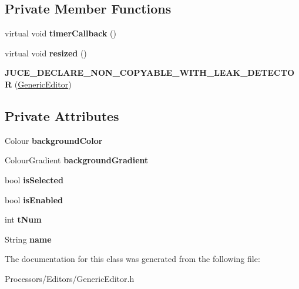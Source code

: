 \subsection*{Private Member Functions}
\begin{DoxyCompactItemize}
\item 
\hypertarget{classGenericEditor_a12c45104009fc083007c65f040583320}{virtual void {\bfseries timer\-Callback} ()}\label{classGenericEditor_a12c45104009fc083007c65f040583320}

\item 
\hypertarget{classGenericEditor_aab1e9c4f507c32cd1683a4fd2b610718}{virtual void {\bfseries resized} ()}\label{classGenericEditor_aab1e9c4f507c32cd1683a4fd2b610718}

\item 
\hypertarget{classGenericEditor_a4deed1f9dcc59fb630d0ca0a5d62b5ab}{{\bfseries J\-U\-C\-E\-\_\-\-D\-E\-C\-L\-A\-R\-E\-\_\-\-N\-O\-N\-\_\-\-C\-O\-P\-Y\-A\-B\-L\-E\-\_\-\-W\-I\-T\-H\-\_\-\-L\-E\-A\-K\-\_\-\-D\-E\-T\-E\-C\-T\-O\-R} (\hyperlink{classGenericEditor}{Generic\-Editor})}\label{classGenericEditor_a4deed1f9dcc59fb630d0ca0a5d62b5ab}

\end{DoxyCompactItemize}
\subsection*{Private Attributes}
\begin{DoxyCompactItemize}
\item 
\hypertarget{classGenericEditor_a0763036019394e15cc49ab1bffb57333}{Colour {\bfseries background\-Color}}\label{classGenericEditor_a0763036019394e15cc49ab1bffb57333}

\item 
\hypertarget{classGenericEditor_adfb224e3a4b76277d020172fa837c334}{Colour\-Gradient {\bfseries background\-Gradient}}\label{classGenericEditor_adfb224e3a4b76277d020172fa837c334}

\item 
\hypertarget{classGenericEditor_aee0ece43c57ee21df782e481fc8e8959}{bool {\bfseries is\-Selected}}\label{classGenericEditor_aee0ece43c57ee21df782e481fc8e8959}

\item 
\hypertarget{classGenericEditor_a2481dbae00beaed730efcaa00e6d8e92}{bool {\bfseries is\-Enabled}}\label{classGenericEditor_a2481dbae00beaed730efcaa00e6d8e92}

\item 
\hypertarget{classGenericEditor_aa6ac3f1214a6e746a04293b2a17f5912}{int {\bfseries t\-Num}}\label{classGenericEditor_aa6ac3f1214a6e746a04293b2a17f5912}

\item 
\hypertarget{classGenericEditor_a7e0e6439c13dbea6863e0f4c9468700c}{String {\bfseries name}}\label{classGenericEditor_a7e0e6439c13dbea6863e0f4c9468700c}

\end{DoxyCompactItemize}


The documentation for this class was generated from the following file\-:\begin{DoxyCompactItemize}
\item 
Processors/\-Editors/Generic\-Editor.\-h\end{DoxyCompactItemize}
